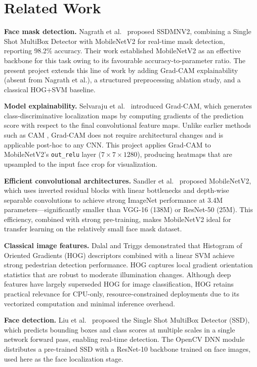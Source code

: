 \documentclass[11pt,a4paper]{article}
\begin{document}
\section{Related Work}

\textbf{Face mask detection.}
Nagrath et al.\ \cite{nagrath2021} proposed SSDMNV2, combining a Single Shot
MultiBox Detector with MobileNetV2 for real-time mask detection, reporting 98.2\%
accuracy.
Their work established MobileNetV2 as an effective backbone for this task owing to
its favourable accuracy-to-parameter ratio.
The present project extends this line of work by adding Grad-CAM explainability
(absent from Nagrath et al.), a structured preprocessing ablation study, and a
classical HOG+SVM baseline.

\textbf{Model explainability.}
Selvaraju et al.\ \cite{selvaraju2017} introduced Grad-CAM, which generates
class-discriminative localization maps by computing gradients of the prediction
score with respect to the final convolutional feature maps.
Unlike earlier methods such as CAM \cite{zhou2016}, Grad-CAM does not require
architectural changes and is applicable post-hoc to any CNN.
This project applies Grad-CAM to MobileNetV2's \texttt{out\_relu} layer
($7{\times}7{\times}1280$), producing heatmaps that are upsampled to the input
face crop for visualization.

\textbf{Efficient convolutional architectures.}
Sandler et al.\ \cite{sandler2018} proposed MobileNetV2, which uses inverted
residual blocks with linear bottlenecks and depth-wise separable convolutions to
achieve strong ImageNet performance at 3.4M parameters---significantly smaller
than VGG-16 (138M) or ResNet-50 (25M).
This efficiency, combined with strong pre-training, makes MobileNetV2 ideal for
transfer learning on the relatively small face mask dataset.

\textbf{Classical image features.}
Dalal and Triggs \cite{dalal2005} demonstrated that Histogram of Oriented
Gradients (HOG) descriptors combined with a linear SVM achieve strong pedestrian
detection performance.
HOG captures local gradient orientation statistics that are robust to moderate
illumination changes.
Although deep features have largely superseded HOG for image classification, HOG
retains practical relevance for CPU-only, resource-constrained deployments due to
its vectorized computation and minimal inference overhead.

\textbf{Face detection.}
Liu et al.\ \cite{liu2016} proposed the Single Shot MultiBox Detector (SSD),
which predicts bounding boxes and class scores at multiple scales in a single
network forward pass, enabling real-time detection.
The OpenCV DNN module distributes a pre-trained SSD with a ResNet-10 backbone
trained on face images, used here as the face localization stage.
\end{document}
